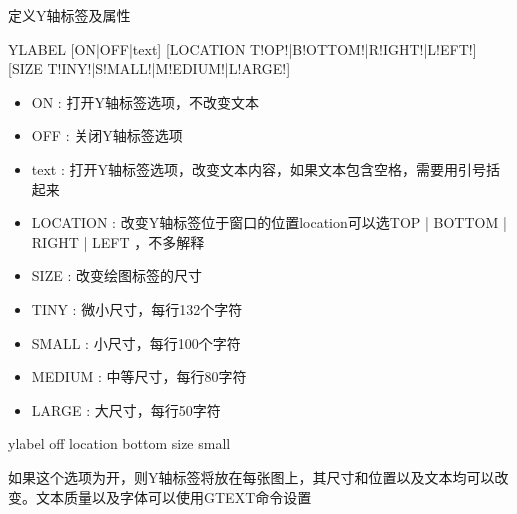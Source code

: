 \label{cmd:ylabel}

定义Y轴标签及属性

\begin{SACSTX}
YLABEL [ON|OFF|text] [LOCATION T!OP!|B!OTTOM!|R!IGHT!|L!EFT!] 
    [SIZE T!INY!|S!MALL!|M!EDIUM!|L!ARGE!]
\end{SACSTX}

\begin{itemize}
\item ON : 打开Y轴标签选项，不改变文本 
\item OFF : 关闭Y轴标签选项 
\item text : 打开Y轴标签选项，改变文本内容，如果文本包含空格，需要用引号括起来
\item LOCATION : 改变Y轴标签位于窗口的位置location可以选TOP | BOTTOM | RIGHT | LEFT ，不多解释
\item SIZE :  改变绘图标签的尺寸 
\item TINY : 微小尺寸，每行132个字符
\item SMALL :  小尺寸，每行100个字符 
\item MEDIUM : 中等尺寸，每行80字符 
\item LARGE : 大尺寸，每行50字符 
\end{itemize}

\begin{SACDFT}
ylabel off location bottom size small
\end{SACDFT}

如果这个选项为开，则Y轴标签将放在每张图上，其尺寸和位置以及文本均可以改变。文本质量以及字体可以使用GTEXT命令设置

